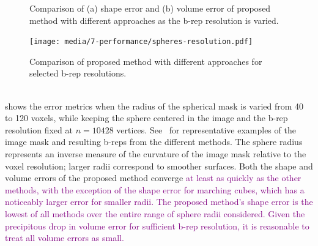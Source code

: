 \begin{figure}[h!]
\centering
{}
%	
\caption{Comparison of (a) shape error and (b) volume error of proposed method with different approaches as the b-rep resolution is varied.}
\label{fig:graph1}
\end{figure}
\begin{figure}[ht!]
	\centering
	\texttt{[image: media/7-performance/spheres-resolution.pdf]}
	\caption{Comparison of proposed method with different approaches for selected b-rep resolutions.}
	\label{fig:demos1}
\end{figure} \\
%
 shows the error metrics when the radius of the spherical mask is varied from 40 to 120 voxels, while keeping the sphere centered in the image and the b-rep resolution fixed at $n = 10428$ vertices. See~ for representative examples of the image mask and resulting b-reps from the different methods. The sphere radius represents an inverse measure of the curvature of the image mask relative to the voxel resolution; larger radii correspond to smoother surfaces. Both the shape and volume errors of the proposed method converge \textcolor{purple}{at least as quickly as the other methods, with the exception of the shape error for marching cubes, which has a noticeably larger error for smaller radii. The proposed method's shape error is the lowest of all methods over the entire range of sphere radii considered. Given the precipitous drop in volume error for sufficient b-rep resolution, it is reasonable to treat all volume errors as small.}


